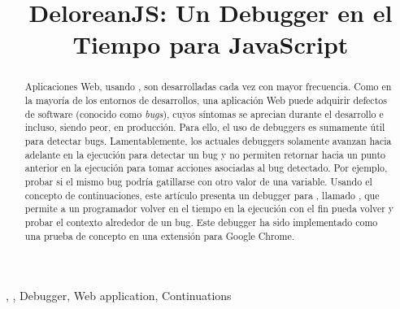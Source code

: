 \documentclass[conference]{IEEEtran}
\begin{document}
\title{DeloreanJS: Un Debugger en el Tiempo para JavaScript}

\author{
\and
{}
\and
{}
}

\maketitle

\begin{abstract}
Aplicaciones Web, usando \javascript, son desarrolladas cada vez con mayor frecuencia. Como en la mayor\'ia de los entornos de desarrollos, una aplicaci\'on Web puede adquirir defectos de software (conocido como {\em bugs}), cuyos s\'intomas se aprecian durante el desarrollo e incluso, siendo peor, en producci\'on. Para ello, el uso de debuggers es sumamente \'util para detectar bugs. Lamentablemente, los actuales debuggers solamente avanzan hacia adelante en la ejecuci\'on para detectar un bug y no permiten retornar hacia un punto anterior en la ejecuci\'on para tomar acciones asociadas al bug detectado. Por ejemplo, probar si el mismo bug podr\'ia gatillarse con otro valor de una variable. Usando el concepto de continuaciones, este art\'iculo presenta un debugger para \javascript, llamado \deloreanjs, que permite a un programador volver en el tiempo en la ejecuci\'on con el fin pueda volver y probar el contexto alrededor de un bug. Este debugger ha sido implementado como una prueba de concepto en una extensi\'on para Google Chrome.         
\end{abstract}

\begin{IEEEkeywords}
\deloreanjs, \javascript, Debugger, Web application, Continuations
\end{IEEEkeywords}
\end{document}
